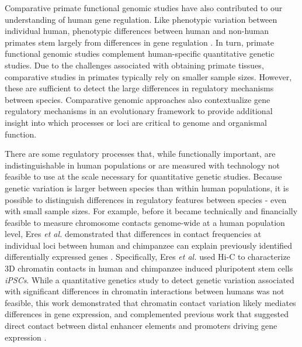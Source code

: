 Comparative primate functional genomic studies have also contributed to our understanding of human gene regulation. Like phenotypic variation between individual human, phenotypic differences between human and non-human primates stem largely from differences in gene regulation \citep{King1975, carroll_evolution_2005, gilad_expression_2006, wray_evolutionary_2007, blekhman_gene_2008, karaman_comparative_2003}. In turn, primate functional genomic studies complement human-specific quantitative genetic studies. Due to the challenges associated with obtaining primate tissues, comparative studies in primates typically rely on smaller sample sizes. However, these are sufficient to detect the large differences in regulatory mechanisms between species. Comparative genomic approaches also contextualize gene regulatory mechanisms in an evolutionary framework to provide additional insight into which processes or loci are critical to genome and organismal function. 

There are some regulatory processes that, while functionally important, are indistinguishable in human populations or are measured with technology not feasible to use at the scale necessary for quantitative genetic studies. Because genetic variation is larger between species than within human populations, it is possible to distinguish differences in regulatory features between species - even with small sample sizes. For example, before it became technically and financially feasible to measure chromosome contacts genome-wide at a human population level, Eres \emph{et al.} demonstrated that differences in contact frequencies at individual loci between human and chimpanzee can explain previously identified differentially expressed genes \citep{eres_reorganization_2019}. Specifically, Eres \emph{et al.} used Hi-C to characterize 3D chromatin contacts in human and chimpanzee induced pluripotent stem cells \emph{iPSCs}. While a quantitative genetics study to detect genetic variation associated with significant differences in chromatin interactions between humans was not feasible, this work demonstrated that chromatin contact variation likely mediates differences in gene expression, and complemented previous work that suggested direct contact between distal enhancer elements and promoters driving gene expression \citep{carter_long-range_2002, krivega_enhancer_2012, tolhuis_looping_2002, palstra_-globin_2003, marsman_long_2012}.

